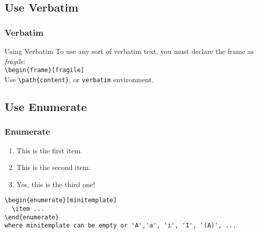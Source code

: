 \subsection{Use Verbatim}
\begin{frame}[fragile]
\frametitle{Verbatim}

  \begin{tiny}
    \begin{semiverbatim}
       
       
      \uncover<2->{ \}} 
    \end{semiverbatim}
  \end{tiny}

  \pause\pause\pause

  \begin{block}{Using Verbatim}
    To use any sort of verbatim text, you must declare the frame as \textsl{fragile}:\\ \verb|\begin{frame}[fragile]|\\
    Use \verb|\path{content}|,  or \verb|verbatim| environment.
  \end{block}

\end{frame}
\subsection{Use Enumerate}
\begin{frame}[fragile]
\frametitle{Enumerate}

  \begin{enumerate}[A]
    \item This is the first item.
    \item This is the second item.
    \item Yes, this is the third one!
  \end{enumerate}

  \vfill

  \begin{footnotesize}
    \begin{verbatim}
\begin{enumerate}[minitemplate]
  \item ...
\end{enumerate}
where minitemplate can be empty or 'A','a', 'i', 'I', '(A)', ...
    \end{verbatim}
  \end{footnotesize}

\end{frame}
